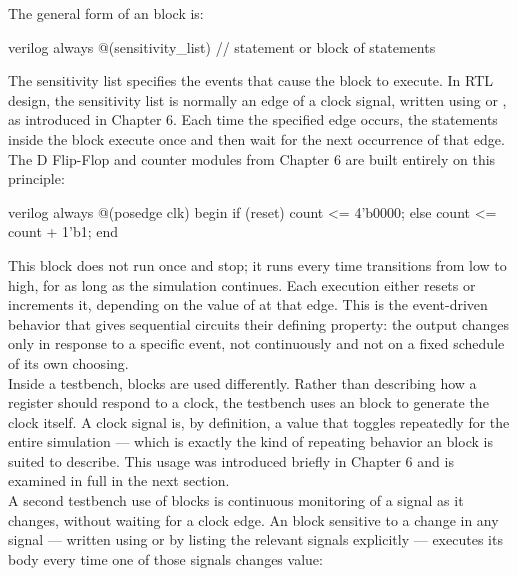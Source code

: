 The general form of an  block is:

\begin{codeblock}{verilog}
always @(sensitivity_list)
    // statement or block of statements
\end{codeblock}

The sensitivity list specifies the events that cause the block to execute. In RTL design, the sensitivity list is normally an edge of a clock signal, written using  or , as introduced in Chapter 6. Each time the specified edge occurs, the statements inside the block execute once and then wait for the next occurrence of that edge. The D Flip-Flop and counter modules from Chapter 6 are built entirely on this principle:
\begin{codeblock}{verilog}
always @(posedge clk) begin
    if (reset)
        count <= 4'b0000;
    else
        count <= count + 1'b1;
end
\end{codeblock}

\noindent This block does not run once and stop; it runs every time  transitions from low to high, for as long as the simulation continues. Each execution either resets  or increments it, depending on the value of  at that edge. This is the event-driven behavior that gives sequential circuits their defining property: the output changes only in response to a specific event, not continuously and not on a fixed schedule of its own choosing.\\

\noindent Inside a testbench,  blocks are used differently. Rather than describing how a register should respond to a clock, the testbench uses an  block to generate the clock itself. A clock signal is, by definition, a value that toggles repeatedly for the entire simulation — which is exactly the kind of repeating behavior an  block is suited to describe. This usage was introduced briefly in Chapter 6 and is examined in full in the next section. \\

\noindent  A second testbench use of  blocks is continuous monitoring of a signal as it changes, without waiting for a clock edge. An  block sensitive to a change in any signal — written using  or by listing the relevant signals explicitly — executes its body every time one of those signals changes value: 

